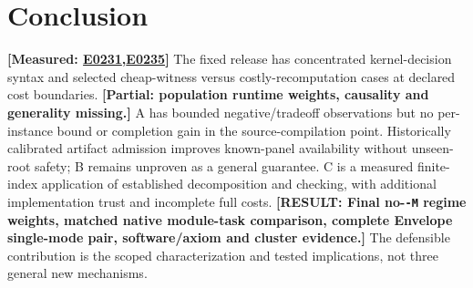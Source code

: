 \documentclass[10pt,twocolumn]{article}
\newcommand{\missing}[1]{\textbf{[RESULT: #1]}}
\newcommand{\measured}[1]{\textbf{[Measured: #1]}}
\newcommand{\partialev}[1]{\textbf{[Partial: #1]}}
\newcommand{\expref}[2]{\href{https://github.com/yunwei37/proofserve/blob/main/docs/tmp/build-and-evaluate/step-#1/step-report.md}{E#2}}
\begin{document}
\section{Conclusion}
\measured{\expref{0231-20261101T001556+0000}{0231},\expref{0235-20261101T041713+0000}{0235}}
The fixed release has concentrated kernel-decision syntax and selected
cheap-witness versus costly-recomputation cases at declared cost boundaries.
\partialev{population runtime weights, causality and generality missing.}
A has bounded negative/tradeoff observations but no per-instance bound or
completion gain in the source-compilation point. Historically calibrated
artifact admission improves known-panel availability without unseen-root safety;
B remains unproven as a general guarantee.
C is a measured finite-index application of established decomposition
and checking, with additional implementation trust and incomplete full costs.
\missing{Final no-\texttt{-M} regime weights, matched native module-task
comparison, complete Envelope single-mode pair, software/axiom and cluster evidence.}
The defensible contribution is the scoped characterization and tested
implications, not three general new mechanisms.



\end{document}
